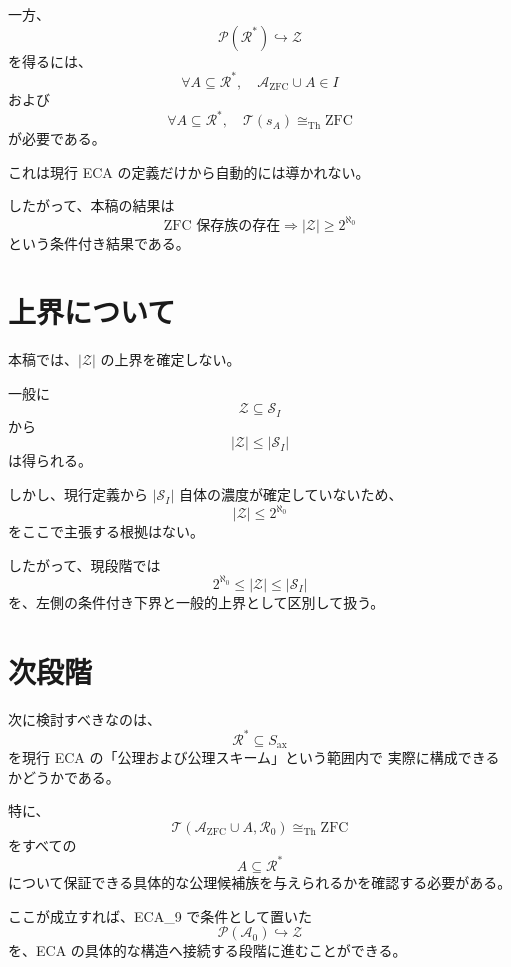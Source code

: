 \documentclass[a4paper,11pt]{jsarticle}
\newcommand{\Solver}{\mathcal{S}}
\newcommand{\Ax}{S_{\mathrm{ax}}}
\begin{document}
一方、
\[
\mathcal{P}(\mathcal{R}^*)\hookrightarrow\mathcal{Z}
\]
を得るには、
\[
\forall A\subseteq\mathcal{R}^*,
\quad
\mathcal{A}_{\mathrm{ZFC}}\cup A\in I
\]
および
\[
\forall A\subseteq\mathcal{R}^*,
\quad
\mathcal{T}(s_A)\cong_{\mathrm{Th}}\mathrm{ZFC}
\]
が必要である。

これは現行 ECA の定義だけから自動的には導かれない。

したがって、本稿の結果は
\[
\boxed{
\text{ZFC 保存族の存在}
\Longrightarrow
|\mathcal{Z}|\geq2^{\aleph_0}
}
\]
という条件付き結果である。

\section{上界について}

本稿では、$|\mathcal{Z}|$ の上界を確定しない。

一般に
\[
\mathcal{Z}\subseteq\Solver_I
\]
から
\[
|\mathcal{Z}|\leq|\Solver_I|
\]
は得られる。

しかし、現行定義から $|\Solver_I|$ 自体の濃度が確定していないため、
\[
|\mathcal{Z}|\leq2^{\aleph_0}
\]
をここで主張する根拠はない。

したがって、現段階では
\[
\boxed{
2^{\aleph_0}\leq|\mathcal{Z}|\leq|\Solver_I|
}
\]
を、左側の条件付き下界と一般的上界として区別して扱う。

\section{次段階}

次に検討すべきなのは、
\[
\mathcal{R}^*\subseteq\Ax
\]
を現行 ECA の「公理および公理スキーム」という範囲内で
実際に構成できるかどうかである。

特に、
\[
\mathcal{T}
\left(
\mathcal{A}_{\mathrm{ZFC}}\cup A,\mathcal{R}_0
\right)
\cong_{\mathrm{Th}}\mathrm{ZFC}
\]
をすべての
\[
A\subseteq\mathcal{R}^*
\]
について保証できる具体的な公理候補族を与えられるかを確認する必要がある。

ここが成立すれば、ECA_9 で条件として置いた
\[
\mathcal{P}(\mathcal{A}_0)\hookrightarrow\mathcal{Z}
\]
を、ECA の具体的な構造へ接続する段階に進むことができる。
\end{document}
